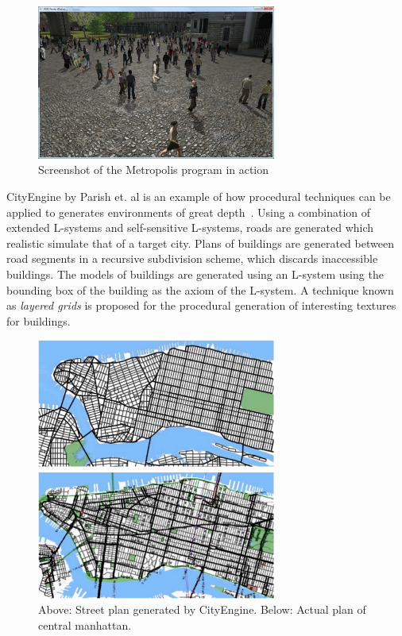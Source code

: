 \begin{figure}
  \centering
    \includegraphics[width=0.7\textwidth]{images/metropolis}
  \caption{Screenshot of the Metropolis program in action}
\end{figure}

CityEngine by Parish et. al is an example of how procedural techniques can be applied to generates environments of great depth~\cite{parish2001procedural}.
Using a combination of extended L-systems and self-sensitive L-systems, roads are generated which realistic simulate that of a target city.
Plans of buildings are generated between road segments in a recursive subdivision scheme, which discards inaccessible buildings.
The models of buildings are generated using an L-system using the bounding box of the building as the axiom of the L-system.
A technique known as \emph{layered grids} is proposed for the procedural generation of interesting textures for buildings.

\begin{figure}
  \centering
    \includegraphics[width=0.7\textwidth]{images/cityengine}
  \caption{Above: Street plan generated by CityEngine. Below: Actual plan of central manhattan.}
\end{figure}

